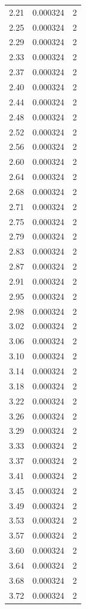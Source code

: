 \begin{longtable}{lrr}
  2.21 & 0.000324 & 2 \\
  2.25 & 0.000324 & 2 \\
  2.29 & 0.000324 & 2 \\
  2.33 & 0.000324 & 2 \\
  2.37 & 0.000324 & 2 \\
  2.40 & 0.000324 & 2 \\
  2.44 & 0.000324 & 2 \\
  2.48 & 0.000324 & 2 \\
  2.52 & 0.000324 & 2 \\
  2.56 & 0.000324 & 2 \\
  2.60 & 0.000324 & 2 \\
  2.64 & 0.000324 & 2 \\
  2.68 & 0.000324 & 2 \\
  2.71 & 0.000324 & 2 \\
  2.75 & 0.000324 & 2 \\
  2.79 & 0.000324 & 2 \\
  2.83 & 0.000324 & 2 \\
  2.87 & 0.000324 & 2 \\
  2.91 & 0.000324 & 2 \\
  2.95 & 0.000324 & 2 \\
  2.98 & 0.000324 & 2 \\
  3.02 & 0.000324 & 2 \\
  3.06 & 0.000324 & 2 \\
  3.10 & 0.000324 & 2 \\
  3.14 & 0.000324 & 2 \\
  3.18 & 0.000324 & 2 \\
  3.22 & 0.000324 & 2 \\
  3.26 & 0.000324 & 2 \\
  3.29 & 0.000324 & 2 \\
  3.33 & 0.000324 & 2 \\
  3.37 & 0.000324 & 2 \\
  3.41 & 0.000324 & 2 \\
  3.45 & 0.000324 & 2 \\
  3.49 & 0.000324 & 2 \\
  3.53 & 0.000324 & 2 \\
  3.57 & 0.000324 & 2 \\
  3.60 & 0.000324 & 2 \\
  3.64 & 0.000324 & 2 \\
  3.68 & 0.000324 & 2 \\
  3.72 & 0.000324 & 2 \\

\end{longtable}
